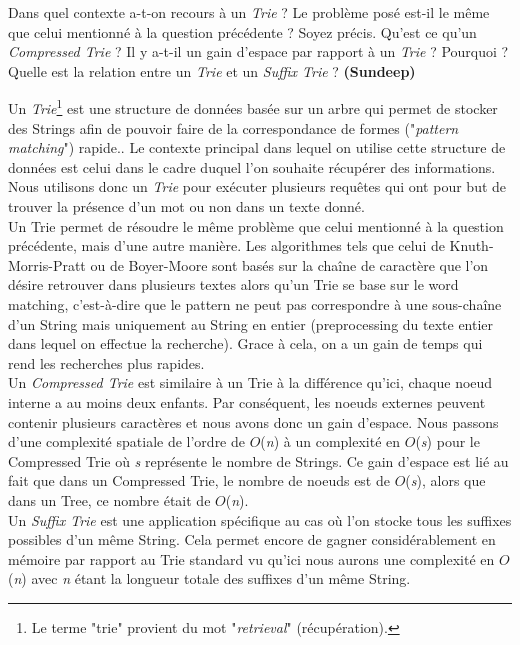 Dans quel contexte a-t-on recours à un \textit{Trie} ? Le problème posé est-il le même
que celui mentionné à la question précédente ? Soyez précis. Qu’est ce qu’un \textit{Compressed Trie} ? Il y a-t-il un gain d’espace par rapport à un \textit{Trie} ? Pourquoi ?
Quelle est la relation entre un \textit{Trie} et un \textit{Suffix Trie} ? \textbf{(Sundeep)}\\
\medskip

Un \textit{Trie}\footnote{Le terme "trie" provient du mot "\textit{retrieval}" (récupération).} est une structure de données basée sur un arbre qui permet de stocker des Strings afin de pouvoir faire de la correspondance de formes ("\textit{pattern matching}") rapide.. Le contexte principal dans lequel on utilise cette structure de données est celui dans le cadre duquel l'on souhaite récupérer des informations. Nous utilisons donc un \textit{Trie} pour exécuter plusieurs requêtes qui ont pour but de trouver la présence d'un mot ou non dans un texte donné. \\

Un Trie permet de résoudre le même problème que celui mentionné à la question précédente, mais d'une autre manière. Les algorithmes tels que celui de Knuth-Morris-Pratt ou de Boyer-Moore sont basés sur la chaîne de caractère que l'on désire retrouver dans plusieurs textes alors qu'un Trie se base sur le word matching, c'est-à-dire que le pattern ne peut pas correspondre à une sous-chaîne d'un String mais uniquement au String en entier (preprocessing du texte entier dans lequel on effectue la recherche). Grace à cela, on a un gain de temps qui rend les recherches plus rapides. \\

Un  \textit{Compressed Trie} est similaire à un Trie à la différence qu'ici, chaque noeud interne a au moins deux enfants. Par conséquent, les noeuds externes peuvent contenir plusieurs caractères et nous avons donc un gain d'espace. Nous passons d'une complexité spatiale de l'ordre de $O$(\textit{n}) à un complexité en $O$(\textit{s}) pour le Compressed Trie où \textit{s} représente le nombre de Strings. Ce gain d'espace est lié au fait que dans un Compressed Trie, le nombre de noeuds est de $O$(\textit{s}), alors que dans un Tree, ce nombre était de $O$(\textit{n}).\\

Un \textit{Suffix Trie} est une application spécifique au cas où l'on stocke tous les suffixes possibles d'un même String. Cela permet encore de gagner considérablement en mémoire par rapport au Trie standard vu qu'ici nous aurons une complexité en $O$(\textit{n}) avec \textit{n} étant la longueur totale des suffixes d'un même String. \\